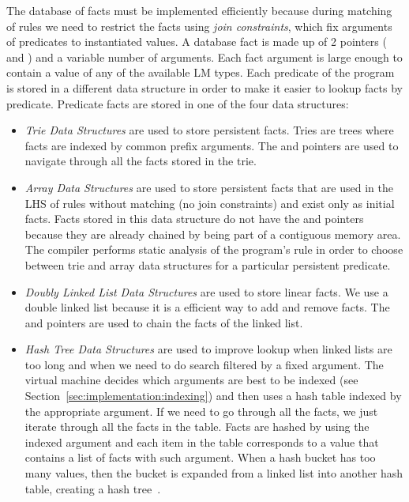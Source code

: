 The database of facts must be implemented efficiently because during matching of
rules we need to restrict the facts using \emph{join constraints}, which fix
arguments of predicates to instantiated values. A database fact is made up of 2
pointers ( and ) and a variable number of arguments.  Each
fact argument is large enough to contain a value of any of the available LM
types. Each predicate of the program is stored in a different data structure in
order to make it easier to lookup facts by predicate. Predicate facts are stored
in one of the four data structures:

\begin{itemize}

\item \emph{Trie Data Structures} are used to store persistent facts. Tries are
   trees where facts are indexed by common prefix arguments. The  and
    pointers are used to navigate through all the facts stored in the
   trie.

\item \emph{Array Data Structures} are used to store persistent facts that are
   used in the LHS of rules without matching (no join constraints) and exist
   only as initial facts. Facts stored in this data structure do not have the
    and  pointers because they are already chained by
   being part of a contiguous memory area. The compiler performs static analysis
   of the program's rule in order to choose between trie and array data
   structures for a particular persistent predicate.

\item \emph{Doubly Linked List Data Structures} are used to store linear facts.
   We use a double linked list because it is a efficient way to add and
   remove facts. The  and  pointers are used to chain
   the facts of the linked list.

\item \emph{Hash Tree Data Structures} are used to improve lookup when linked
   lists are too long and when we need to do search filtered by a fixed
   argument. The virtual machine decides which arguments are best to be indexed
   (see Section~\ref{sec:implementation:indexing}) and then uses a hash table
   indexed by the appropriate argument. If we need to go through all the facts,
   we just iterate through all the facts in the table. Facts are hashed by using
   the indexed argument and each item in the table corresponds to a value that
   contains a list of facts with such argument. When a hash bucket has too
   many values, then the bucket is expanded from a linked list into another hash
   table, creating a hash tree~\cite{Bagwell01idealhash}.

\end{itemize}

